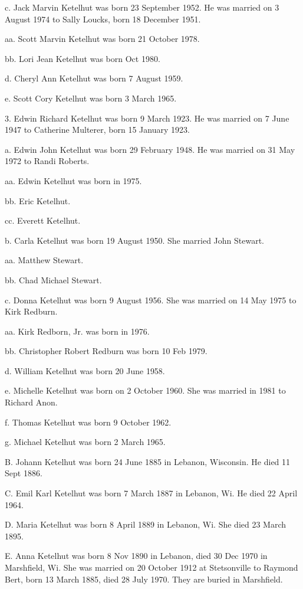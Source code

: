 \documentclass[a4paper]{article}
\begin{document}
c. Jack Marvin Ketelhut was born 23 September 1952.  He was married on 3 August 1974 to Sally Loucks, born 18 December 1951.

aa. Scott Marvin Ketelhut was born 21 October 1978.

bb. Lori  Jean Ketelhut was born Oct 1980.

d. Cheryl Ann Ketelhut was born 7 August 1959.

e. Scott Cory Ketelhut was born 3 March 1965.

3. Edwin Richard Ketelhut was born 9 March 1923.  He was married on 7 June 1947 to Catherine Multerer, born 15 January 1923.

a. Edwin John Ketelhut was born 29 February 1948.  He was married on 31 May 1972 to Randi Roberts.

aa. Edwin Ketelhut was born in 1975.

bb. Eric Ketelhut.

cc. Everett Ketelhut.

b.  Carla Ketelhut was born 19 August 1950.  She married John Stewart.

aa.  Matthew Stewart.

bb. Chad Michael Stewart.

c. Donna Ketelhut was born 9 August 1956.  She was married on 14 May 1975 to Kirk Redburn.

aa. Kirk Redborn, Jr.  was born in 1976.

bb. Christopher Robert Redburn was born 10 Feb 1979.

d. William Ketelhut was born 20 June 1958.

e. Michelle Ketelhut was born on 2 October 1960.  She was married in 1981 to Richard Anon.

f. Thomas Ketelhut was born 9 October 1962.

g. Michael Ketelhut was born 2 March 1965.

B. Johann Ketelhut was born 24 June 1885 in Lebanon, Wisconsin.  He died 11 Sept 1886.

C.  Emil Karl Ketelhut was born 7 March 1887 in Lebanon, Wi.  He died 22 April 1964.

D. Maria Ketelhut was born 8 April 1889 in Lebanon, Wi.  She died 23 March 1895.

E. Anna Ketelhut was born 8 Nov 1890 in Lebanon, died 30 Dec 1970 in Marshfield, Wi. She was married on 20 October 1912 at Stetsonville to Raymond Bert, born 13 March 1885, died 28 July 1970.  They are buried in Marshfield.
\end{document}
